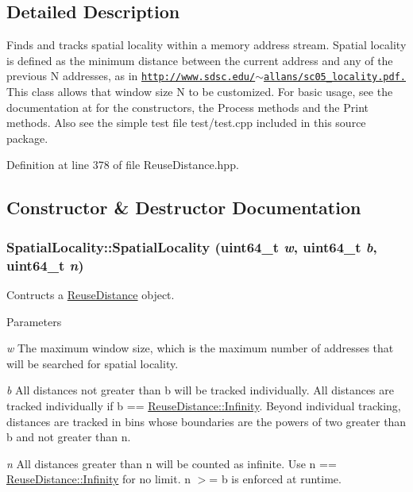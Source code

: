 \subsection{Detailed Description}
Finds and tracks spatial locality within a memory address stream. Spatial locality is defined as the minimum distance between the current address and any of the previous N addresses, as in \href{http://www.sdsc.edu/~allans/sc05_locality.pdf.}{\tt http://www.sdsc.edu/$\sim$allans/sc05\_\-locality.pdf.} This class allows that window size N to be customized. For basic usage, see the documentation at for the constructors, the Process methods and the Print methods. Also see the simple test file test/test.cpp included in this source package. 

Definition at line 378 of file ReuseDistance.hpp.



\subsection{Constructor \& Destructor Documentation}
\hypertarget{class_spatial_locality_aff3106d38ff5ba3e6ecaec0c7214eaea}{
\subsubsection[{SpatialLocality}]{\setlength{\rightskip}{0pt plus 5cm}SpatialLocality::SpatialLocality (uint64\_\-t {\em w}, \/  uint64\_\-t {\em b}, \/  uint64\_\-t {\em n})}}
\label{class_spatial_locality_aff3106d38ff5ba3e6ecaec0c7214eaea}
Contructs a \hyperlink{class_reuse_distance}{ReuseDistance} object.


\begin{DoxyParams}{Parameters}
\item[{\em w}]The maximum window size, which is the maximum number of addresses that will be searched for spatial locality. \item[{\em b}]All distances not greater than b will be tracked individually. All distances are tracked individually if b == \hyperlink{class_reuse_distance_a59f7f0ac6ad014472537619394ac7375}{ReuseDistance::Infinity}. Beyond individual tracking, distances are tracked in bins whose boundaries are the powers of two greater than b and not greater than n. \item[{\em n}]All distances greater than n will be counted as infinite. Use n == \hyperlink{class_reuse_distance_a59f7f0ac6ad014472537619394ac7375}{ReuseDistance::Infinity} for no limit. n $>$= b is enforced at runtime. \end{DoxyParams}


